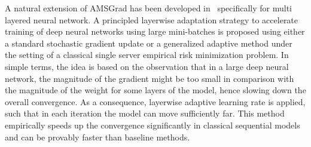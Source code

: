 \documentclass[11pt]{article}
\begin{document}


A natural extension of AMSGrad has been developed in~\cite{you2019large} specifically for multi layered neural network. 
A principled layerwise adaptation strategy to accelerate training of deep neural networks using large mini-batches is proposed using either a standard stochastic gradient update or a generalized adaptive method under the setting of a classical single server empirical risk minimization problem. 
 In simple terms, the idea is based on the observation that in a large deep neural network, the magnitude of the gradient might be too small in comparison with the magnitude of the weight for some layers of the model, hence slowing down the overall convergence. 
As a consequence, layerwise adaptive learning rate is applied, such that in each iteration the model can move sufficiently far. 
This method empirically speeds up the convergence significantly in classical sequential models and can be provably faster than baseline methods.


\vspace{0.05in}
\end{document}

